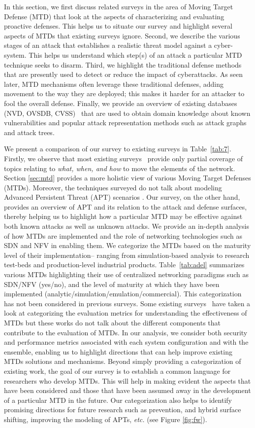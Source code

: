 \label{sec:background}
In this section, we first discuss related surveys in the area of Moving Target Defense (MTD) that look at the aspects of characterizing and evaluating proactive defenses. This helps us to situate our survey and highlight several aspects of MTDs that existing surveys ignore. Second, we describe the various stages of an attack that establishes a realistic threat model against a cyber-system. This helps us understand which step(s) of an attack a particular MTD technique seeks to disarm.  Third, we highlight the traditional defense methods that are presently used to detect or reduce the impact of cyberattacks. As seen later, MTD mechanisms often leverage these traditional defenses, adding movement to the way they are deployed; this makes it harder for an attacker to fool the overall defense. Finally, we provide an overview of existing databases (NVD, OVSDB, CVSS)~ that are used to obtain domain knowledge about known vulnerabilities and popular attack representation methods such as attack graphs and attack trees.

We present a comparison of our survey to existing surveys in Table~\ref{tab:7}. Firstly, we observe that most existing surveys~ provide only partial coverage of topics relating to \emph{what, when, and how} to move the elements of the network. Section \ref{sec:mtd} provides a more holistic view of various Moving Target Defenses (MTDs). Moreover, the techniques surveyed do not talk about modeling Advanced Persistent Threat (APT) scenarios . Our survey, on the other hand, provides an overview of APT and its relation to the attack and defense surfaces, thereby helping us to highlight how a particular MTD may be effective against both known attacks as well as unknown attacks.
We provide an in-depth analysis of how MTDs are implemented and the role of networking technologies such as SDN and NFV in enabling them. We categorize the MTDs based on the maturity level of their implementation-- ranging from simulation-based analysis to research test-beds and production-level industrial products. Table~\ref{tab:adel} summarizes various MTDs highlighting their use of centralized networking paradigms such as SDN/NFV (yes/no), and the level of maturity at which they have been implemented (analytic/simulation/emulation/commercial). This categorization has not been considered in previous surveys.
Some existing surveys~ have taken a look at categorizing the evaluation metrics for understanding the effectiveness of MTDs but these works do not talk about the different components that contribute to the evaluation of MTDs. In our analysis, we consider both security and performance metrics associated with each system configuration and with the ensemble, enabling us to highlight directions that can help improve existing MTDs solutions and mechanisms.
Beyond simply providing a categorization of existing work, the goal of our survey is to establish a common language for researchers who develop MTDs. This will help in making evident the aspects that have been considered and those that have been assumed away in the development of a particular MTD in the future. Our categorization also helps to identify promising directions for future research such as prevention, and hybrid surface shifting, improving the modeling of APTs, {\em etc.} (see Figure \ref{fig:fw}).

